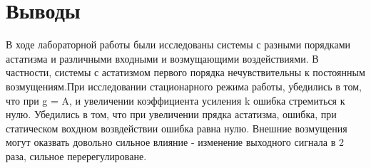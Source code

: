 \documentclass[a4paper, 11pt]{article}
\begin{document}
\section*{Выводы}
В ходе лабораторной работы были исследованы системы с разными порядками астатизма и различными входными и возмущающими воздействиями. В частности, системы с астатизмом первого порядка нечувствительны к постоянным возмущениям.При исследовании стационарного режима работы, убедились в том, что при g = A, и увеличении коэффициента усиления k ошибка стремиться к нулю. 
Убедились в том, что при увеличении прядка астатизма, ошибка, при статическом вохдном возвдействии ошибка равна нулю.
Внешние возмущения могут оказвать довольно сильное влияние - изменение выходного сигнала в 2 раза, сильное перерегулироване.
\end{document}
